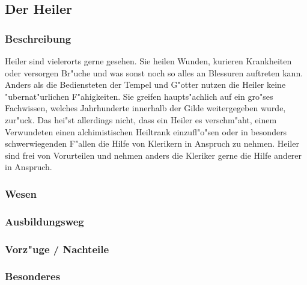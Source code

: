 \subsection{Der Heiler}
\subsubsection{Beschreibung}
\par Heiler sind vielerorts gerne gesehen. Sie heilen Wunden, kurieren Krankheiten oder versorgen Br"uche und was sonst noch so alles an Blessuren auftreten kann. Anders als die Bediensteten der Tempel und G"otter nutzen die Heiler keine "ubernat"urlichen F"ahigkeiten. Sie greifen haupts"achlich auf ein gro"ses Fachwissen, welches Jahrhunderte innerhalb der Gilde weitergegeben wurde, zur"uck. Das hei"st allerdings nicht, dass ein Heiler es verschm"aht, einem Verwundeten einen alchimistischen Heiltrank einzufl"o"sen oder in besonders schwerwiegenden F"allen die Hilfe von Klerikern in Anspruch zu nehmen. Heiler sind frei von Vorurteilen und nehmen anders die Kleriker gerne die Hilfe anderer in Anspruch.
\subsubsection{Wesen}
\subsubsection{Ausbildungsweg}
\subsubsection{Vorz"uge / Nachteile}
\subsubsection{Besonderes}
